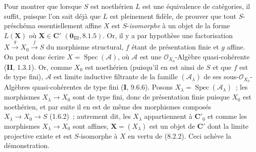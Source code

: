 Pour montrer que lorsque $S$ est noethérien $L$ est une équivalence de
catégories, il suffit, puisque l'on sait déjà que $L$ est pleinement fidèle,
de prouver que tout $S$-préschéma essentiellement affine $X$ est
$S$-\emph{isomorphe} à un objet de la forme $L(\mathbf X)$ où
$\mathbf X\in\boldsymbol{C}'$ $(\mathbf 0_{\mathrm{III}},8.1.5)$.
Or, il y a par hypothèse une factorisation
$X\xrightarrow{g}X_0\xrightarrow{f}S$ du morphisme structural, $f$ étant de
présentation finie et $g$ affine. On peut donc écrire
$X=\operatorname{Spec}(\mathcal A)$, où $\mathcal A$ est une
$\mathcal O_{X_0}$-Algèbre quasi-cohérente (\textbf{II}, 1.3.1). Or, comme $X_0$ est
noethérien (puisqu'il en est ainsi de $S$ et que $f$ est de type fini),
$\mathcal A$ est limite inductive filtrante de la famille
$(\mathcal A_\lambda)$ de ses sous-$\mathcal O_{X_0}$-Algèbres quasi-cohérentes
de type fini (\textbf{I}, 9.6.6). Posons
$X_\lambda=\operatorname{Spec}(\mathcal A_\lambda)$~; les morphismes
$X_\lambda\to X_0$ sont de type fini, donc de présentation finie puisque
$X_0$ est noethérien, et par suite il en est de même des morphismes composés
$X_\lambda\to X_0\to S$ (1.6.2)~; autrement dit, les $X_\lambda$
appartiennent à $\boldsymbol{C}'_0$ et comme les morphismes $X_\lambda\to X_0$
sont affines, $\mathbf X=(X_\lambda)$ est un objet de $\boldsymbol{C}'$ dont la
limite projective existe et est $S$-isomorphe à $X$ en vertu de (8.2.2). Ceci
achève la démonstration.

